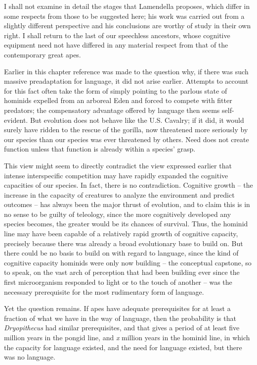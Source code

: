 I shall not examine in detail the stages that Lamendella proposes, which differ in some respects from those to be suggested here; his work was carried out from a slightly different perspective and his conclusions are worthy of study in their own right. I shall return to the last of our speechless ancestors, whose cognitive equipment need not have differed in any material respect from that of the contemporary great apes.

Earlier in this chapter reference was made to the question why, if there was such massive preadaptation for language, it did not arise earlier. Attempts to account for this fact often take the form of simply pointing to the parlous state of hominids expelled from an arboreal Eden and forced to compete with fitter predators; the compensatory advantage offered by language then seems self-evident. But evolution does not behave like the U.S. Cavalry; if it did, it would surely have ridden to the rescue of the gorilla, now threatened more seriously by our species than our species was ever threatened by others. Need does not create function unless that function is already within a species' grasp.

This view might seem to directly contradict the view expressed earlier that intense interspecific competition may have rapidly expanded the cognitive capacities of our species. In fact, there is no contradiction. Cognitive growth -- the increase in the capacity of creatures to analyze the environment and predict outcomes -- has always been the major thrust of evolution, and to claim this is in no sense to be guilty of teleology, since the more cognitively developed any species
becomes, the greater would be its chances of survival. Thus, the hominid line may have been capable of a relatively rapid growth of cognitive capacity, precisely because there was already a broad evolutionary base to build on. But there could be no basis to build on with regard to language, since the kind of cognitive capacity hominids were only now building -- the conceptual capstone, so to speak, on the vast arch of perception that had been building ever since the first microorganism responded to light or to the touch of another -- was the necessary prerequisite for the most rudimentary form of language.

Yet the question remains. If apes have adequate prerequisites for at least a fraction of what we have in the way of language, then the probability is that \textit{Dryopithecus} had similar prerequisites, and that gives a period of at least five million years in the pongid line, and \textit{x} million years in the hominid line, in which the capacity for language existed, and the need for language existed, but there was no language.


